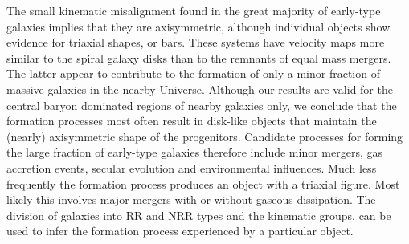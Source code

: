 \documentclass[usenatbib,usegraphicx]{mn2e}
\begin{document}
The small kinematic misalignment found in the great majority of early-type galaxies implies that they are axisymmetric, although individual objects show evidence for triaxial shapes, or bars. These systems have velocity maps more similar to the spiral galaxy disks than to the remnants of equal mass mergers. The latter appear to contribute to the formation of only a minor fraction of massive galaxies in the nearby Universe. Although our results are valid for the central baryon dominated regions of nearby galaxies only, we conclude that the formation processes most often result in disk-like objects that maintain the (nearly) axisymmetric shape of the progenitors. Candidate processes for forming the large fraction of early-type galaxies therefore include minor mergers, gas accretion events, secular evolution and environmental influences. Much less frequently the formation process produces an object with a triaxial figure. Most likely this involves major mergers with or without gaseous dissipation. The division of galaxies into RR and NRR types and the kinematic groups, can be used to infer the formation process experienced by a particular object.
 
 

 
\vspace{+1cm}
\\
\end{document}
